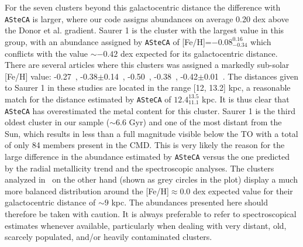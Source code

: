 \documentclass[draft]{aa}
\begin{document}
  For the seven clusters beyond this galactocentric distance the
  difference with \texttt{ASteCA} is larger, where our code assigns abundances
  on average 0.20 dex above the Donor et al. gradient.
  Saurer 1 is the cluster with the largest value in this group, with
  an abundance assigned by \texttt{ASteCA} of [Fe/H]=$-0.08_{-0.34}^{0.16}$
  which conflicts with the value $\sim-0.42$ dex expected for its
  galactocentric distance.
  There are several articles where this clusters was assigned a 
  markedly sub-solar [Fe/H] value: -0.27~\citep{Carraro_2003},
  -0.38$\pm$0.14~\citep{Carraro_2004},
  -0.50~\citep{Frinchaboy_2004b}, -0.38~\citep{Frinchaboy_2006},
  -0.42$\pm$0.01~\citep{Donor_2020}. The distances given to Saurer 1 in these
  studies are located in the range [12, 13.2] kpc, a reasonable match
  for the distance estimated by \texttt{ASteCA} of $12.4_{11.1}^{13.5}$ kpc. It
  is thus clear that \texttt{ASteCA} has overestimated the metal
  content for this cluster. Saurer 1 is the third oldest cluster in our sample 
  ($\sim6.6$ Gyr) and one of the most distant from the Sun, which results in
  less than a  full magnitude visible below the TO with a total of only 84
  members present in the CMD. This is very likely the reason
  for the large difference in the abundance estimated by \texttt{ASteCA}
  versus the one predicted by the radial metallicity trend and the
  spectroscopic analyses.
  The clusters analyzed in~\cite{Perren_2020} on the other hand (shown as grey
  circles in the plot) display a much more balanced distribution around the 
  [Fe/H]$\approx0.0$ dex expected value for their galactocentric distance of
  $\sim9$ kpc.
  The abundances presented here should therefore be taken with
  caution. It is always preferable to refer to spectroscopical estimates
  whenever available, particularly when dealing with very distant, old,
  scarcely populated, and/or heavily contaminated clusters.\\
\end{document}
